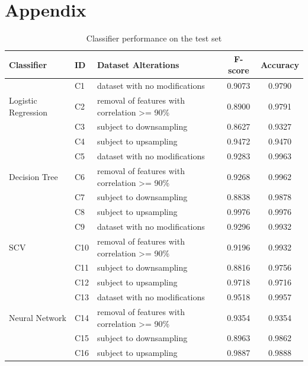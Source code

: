 \documentclass[11pt]{article}
\begin{document}
%



\onecolumn
\clearpage  
\section{Appendix}
\label{sec:appendix}

\begin{table}[h]
  \centering
  \begin{tabular}{lp{0.6cm}lcc}
      \toprule
      Classifier & ID & Dataset Alterations & F-score & Accuracy \\
      \midrule

      \multirow{3}{*}{Logistic Regression}
        & C1 & {\footnotesize dataset with no modifications}   & 0.9073 & 0.9790\\
        & C2 & {\footnotesize removal of features with correlation >= 90\%} & 0.8900 & 0.9791 \\
        & C3 & {\footnotesize subject to downsampling} & 0.8627 & 0.9327 \\
        & C4 & {\footnotesize subject to upsampling} & 0.9472 & 0.9470 \\
      \midrule

      \multirow{3}{*}{Decision Tree}
      & C5 & {\footnotesize dataset with no modifications}   & 0.9283 & 0.9963 \\
      & C6 & {\footnotesize removal of features with correlation >= 90\%} & 0.9268 & 0.9962 \\
      & C7 & {\footnotesize subject to downsampling} & 0.8838 & 0.9878 \\
      & C8 & {\footnotesize subject to upsampling} & 0.9976 & 0.9976 \\
      \midrule

      \multirow{3}{*}{SCV}
      & C9 & {\footnotesize dataset with no modifications}   & 0.9296 & 0.9932 \\
      & C10 & {\footnotesize removal of features with correlation >= 90\%} & 0.9196 & 0.9932 \\
      & C11 & {\footnotesize subject to downsampling} & 0.8816 & 0.9756 \\
      & C12 & {\footnotesize subject to upsampling} & 0.9718 & 0.9716 \\
      \midrule

      \multirow{3}{*}{Neural Network}
      & C13 & {\footnotesize dataset with no modifications}   & 0.9518 & 0.9957 \\
      & C14 & {\footnotesize removal of features with correlation >= 90\%} & 0.9354 & 0.9354 \\
      & C15 & {\footnotesize subject to downsampling} & 0.8963 & 0.9862 \\
      & C16 & {\footnotesize subject to upsampling} & 0.9887 & 0.9888 \\
      \bottomrule
  \end{tabular}
  \caption{Classifier performance on the test set}
  \label{tab:table1}
\end{table}
\end{document}
